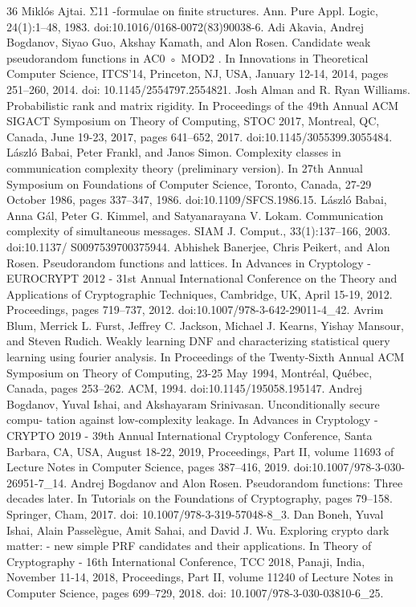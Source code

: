 \documentclass[10pt,a4paper]{article}
\begin{document}
\begin{thebibliography}{36}
Miklós Ajtai. Σ11 -formulae on finite structures. Ann. Pure Appl. Logic, 24(1):1–48, 1983. doi:10.1016/0168-0072(83)90038-6.
Adi Akavia, Andrej Bogdanov, Siyao Guo, Akshay Kamath, and Alon Rosen. Candidate weak pseudorandom functions in AC0 ◦ MOD2 . In Innovations in Theoretical Computer Science, ITCS’14, Princeton, NJ, USA, January 12-14, 2014, pages 251–260, 2014. doi: 10.1145/2554797.2554821.
Josh Alman and R. Ryan Williams. Probabilistic rank and matrix rigidity. In Proceedings of the 49th Annual ACM SIGACT Symposium on Theory of Computing, STOC 2017, Montreal, QC, Canada, June 19-23, 2017, pages 641–652, 2017. doi:10.1145/3055399.3055484.
László Babai, Peter Frankl, and Janos Simon. Complexity classes in communication complexity theory (preliminary version). In 27th Annual Symposium on Foundations of Computer Science, Toronto, Canada, 27-29 October 1986, pages 337–347, 1986. doi:10.1109/SFCS.1986.15.
László Babai, Anna Gál, Peter G. Kimmel, and Satyanarayana V. Lokam. Communication complexity of simultaneous messages. SIAM J. Comput., 33(1):137–166, 2003. doi:10.1137/ S0097539700375944.
Abhishek Banerjee, Chris Peikert, and Alon Rosen. Pseudorandom functions and lattices. In Advances in Cryptology - EUROCRYPT 2012 - 31st Annual International Conference on the Theory and Applications of Cryptographic Techniques, Cambridge, UK, April 15-19, 2012. Proceedings, pages 719–737, 2012. doi:10.1007/978-3-642-29011-4\_42.
Avrim Blum, Merrick L. Furst, Jeffrey C. Jackson, Michael J. Kearns, Yishay Mansour, and Steven Rudich. Weakly learning DNF and characterizing statistical query learning using fourier analysis. In Proceedings of the Twenty-Sixth Annual ACM Symposium on Theory of Computing, 23-25 May 1994, Montréal, Québec, Canada, pages 253–262. ACM, 1994. doi:10.1145/195058.195147.
Andrej Bogdanov, Yuval Ishai, and Akshayaram Srinivasan. Unconditionally secure compu- tation against low-complexity leakage. In Advances in Cryptology - CRYPTO 2019 - 39th Annual International Cryptology Conference, Santa Barbara, CA, USA, August 18-22, 2019, Proceedings, Part II, volume 11693 of Lecture Notes in Computer Science, pages 387–416, 2019. doi:10.1007/978-3-030-26951-7\_14.
Andrej Bogdanov and Alon Rosen. Pseudorandom functions: Three decades later. In Tutorials on the Foundations of Cryptography, pages 79–158. Springer, Cham, 2017. doi: 10.1007/978-3-319-57048-8\_3.
Dan Boneh, Yuval Ishai, Alain Passelègue, Amit Sahai, and David J. Wu. Exploring crypto dark matter: - new simple PRF candidates and their applications. In Theory of Cryptography - 16th International Conference, TCC 2018, Panaji, India, November 11-14, 2018, Proceedings, Part II, volume 11240 of Lecture Notes in Computer Science, pages 699–729, 2018. doi: 10.1007/978-3-030-03810-6\_25.

\end{thebibliography}
\end{document}
